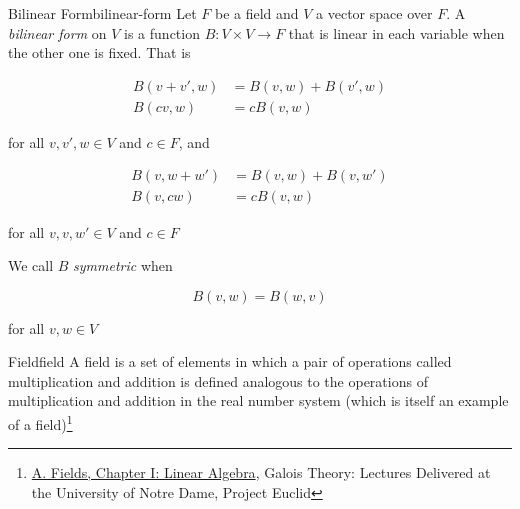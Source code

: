 \begin{Definition}{Bilinear Form}{bilinear-form}
    Let $F$ be a field and $V$ a vector space over $F$. A \textit{bilinear form} on $V$ is a function
    $B: V \times V \rightarrow F$ that is linear in each variable when the other one is fixed. That is

    \begin{align}
        B(v + v', w) &= B(v, w) + B(v', w) \\
        B(cv, w)     &= cB(v, w)
    \end{align}

    for all $v, v', w \in V$ and $c \in F$, and

    \begin{align}
        B(v, w + w') &= B(v, w) + B(v, w') \\
        B(v, cw)     &= cB(v, w)
    \end{align}

    for all $v, v, w' \in V$ and $c \in F$

    We call $B$ \textit{symmetric} when

    \begin{equation}
        B(v, w) = B(w, v)
    \end{equation}

    for all $v, w \in V$

    \begin{Definition}{Field}{field}
        A field is a set of elements in which a pair of operations called multiplication and addition is defined analogous
        to the operations of multiplication and addition in the real number system (which is itself an example of a
        field)\footnote{\href{https://projecteuclid.org/ebooks/notre-dame-mathematical-lectures/Chapter-I-Linear-Algebra/chapter/Chapter-I-Linear-Algebra/ndml/1175197044}{A. Fields, Chapter I: Linear Algebra}, Galois Theory: Lectures Delivered at the University of Notre Dame, Project Euclid}
    \end{Definition}


\end{Definition}
